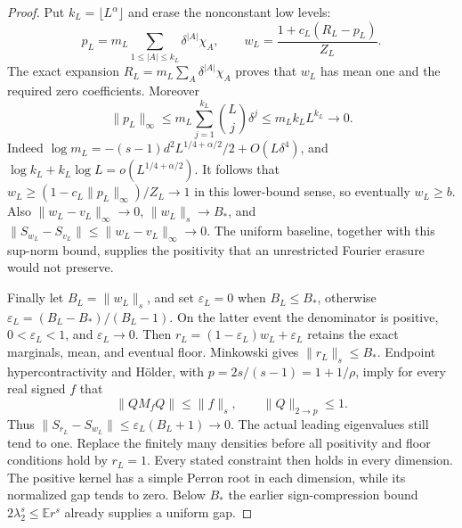 \documentclass[11pt]{article}
\begin{document}
\begin{proof}
Put $k_L=\lfloor L^\alpha\rfloor$ and erase the nonconstant low levels:
\[
 p_L=m_L\sum_{1\leq|A|\leq k_L}\delta^{|A|}\chi_A,\qquad
 w_L=\frac{1+c_L(R_L-p_L)}{Z_L}.
\]
The exact expansion $R_L=m_L\sum_A\delta^{|A|}\chi_A$ proves that
$w_L$ has mean one and the required zero coefficients. Moreover
\[
 \|p_L\|_\infty\leq m_L\sum_{j=1}^{k_L}\binom Lj\delta^j
 \leq m_L k_LL^{k_L}\longrightarrow0.
\]
Indeed $\log m_L=-(s-1)d^2L^{1/4+\alpha/2}/2+O(L\delta^4)$,
and $\log k_L+k_L\log L=o(L^{1/4+\alpha/2})$.
It follows that $w_L\geq(1-c_L\|p_L\|_\infty)/Z_L\to1$ in this
lower-bound sense, so eventually $w_L\geq b$. Also
$\|w_L-v_L\|_\infty\to0$, $\|w_L\|_s\to B_*$, and
$\|S_{w_L}-S_{v_L}\|\leq\|w_L-v_L\|_\infty\to0$.
The uniform baseline, together with this sup-norm bound, supplies the
positivity that an unrestricted Fourier erasure would not preserve.

Finally let $B_L=\|w_L\|_s$, and set $\varepsilon_L=0$ when
$B_L\leq B_*$, otherwise
$\varepsilon_L=(B_L-B_*)/(B_L-1)$. On the latter event the denominator
is positive, $0<\varepsilon_L<1$, and $\varepsilon_L\to0$.
Then $r_L=(1-\varepsilon_L)w_L+\varepsilon_L$ retains the exact
marginals, mean, and eventual floor. Minkowski gives $\|r_L\|_s\leq B_*$.
Endpoint hypercontractivity and H\"older, with
$p=2s/(s-1)=1+1/\rho$, imply for every real signed $f$ that
\begin{equation}\label{eq:critical-signed-322}
 \|QM_fQ\|\leq\|f\|_s,
 \qquad \|Q\|_{2\to p}\leq1.
\end{equation}
Thus $\|S_{r_L}-S_{w_L}\|\leq\varepsilon_L(B_L+1)\to0$.
The actual leading eigenvalues still tend to one. Replace the finitely
many densities before all positivity and floor conditions hold by $r_L=1$.
Every stated constraint then holds in every dimension. The positive kernel
has a simple Perron root in each dimension, while its normalized gap tends
to zero. Below $B_*$ the earlier sign-compression bound
$2\lambda_2^s\leq\mathbb E r^s$ already supplies a uniform gap.
\end{proof}
\end{document}
